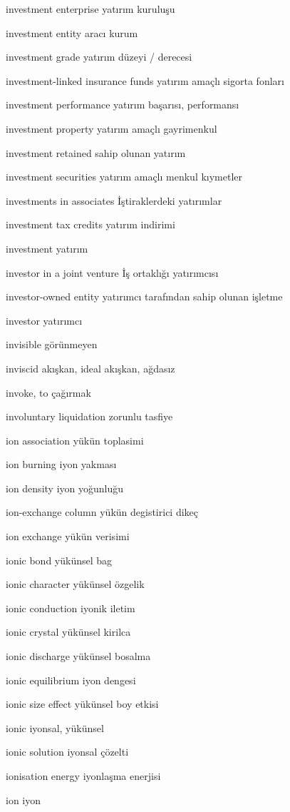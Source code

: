 \documentclass[12pt,fleqn]{article}\usepackage{../../common}
\begin{document}
investment enterprise yatırım kuruluşu

investment entity aracı kurum

investment grade yatırım düzeyi / derecesi

investment-linked insurance funds yatırım amaçlı sigorta fonları

investment performance yatırım başarısı, performansı

investment property yatırım amaçlı gayrimenkul

investment retained sahip olunan yatırım

investment securities yatırım amaçlı menkul kıymetler

investments in associates İştiraklerdeki yatırımlar

investment tax credits yatırım indirimi

investment yatırım

investor in a joint venture İş ortaklığı yatırımcısı

investor-owned entity yatırımcı tarafından sahip olunan işletme

investor yatırımcı

invisible görünmeyen

inviscid akışkan, ideal akışkan, ağdasız

invoke, to çağırmak

involuntary liquidation zorunlu tasfiye

ion association yükün toplasimi

ion burning iyon yakması

ion density iyon yoğunluğu

ion-exchange column yükün degistirici dikeç

ion exchange yükün verisimi

ionic bond yükünsel bag

ionic character yükünsel özgelik

ionic conduction iyonik iletim

ionic crystal yükünsel kirilca

ionic discharge yükünsel bosalma

ionic equilibrium iyon dengesi

ionic size effect yükünsel boy etkisi

ionic iyonsal, yükünsel

ionic solution iyonsal çözelti

ionisation energy iyonlaşma enerjisi

ion iyon
\end{document}
